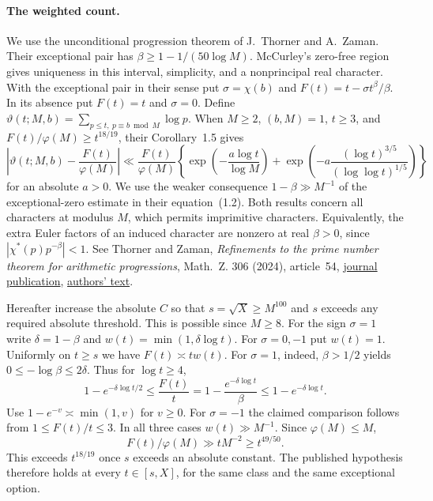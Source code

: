 \paragraph{The weighted count.}
We use the unconditional progression theorem of J.~Thorner and
A.~Zaman. Their exceptional pair has \(\beta\ge1-1/(50\log M)\).
McCurley's zero-free region gives uniqueness in this interval,
simplicity, and a nonprincipal real character. With the exceptional
pair in their sense put \(\sigma=\chi(b)\) and
\(F(t)=t-\sigma t^\beta/\beta\). In its absence put \(F(t)=t\)
and \(\sigma=0\). Define
\(\vartheta(t;M,b)=\sum_{p\le t,\ p\equiv b\bmod M}\log p\).
When \(M\ge2\), \((b,M)=1\), \(t\ge3\), and
\(F(t)/\varphi(M)\ge t^{18/19}\), their Corollary~1.5 gives
\[
 \left|\vartheta(t;M,b)-\frac{F(t)}{\varphi(M)}\right|
 \ll \frac{F(t)}{\varphi(M)}
 \left\{\exp\!\left(-\frac{a\log t}{\log M}\right)
       +\exp\!\left(-a\frac{(\log t)^{3/5}}{(\log\log t)^{1/5}}\right)
 \right\}
\]
for an absolute \(a>0\). We use the weaker consequence
\(1-\beta\gg M^{-1}\) of the exceptional-zero estimate in their
equation~(1.2). Both results concern all characters at modulus
\(M\), which permits imprimitive characters. Equivalently, the
extra Euler factors of an induced character are nonzero at real
\(\beta>0\), since \(|\chi^*(p)p^{-\beta}|<1\).
See Thorner and Zaman, \emph{Refinements to the prime number theorem
for arithmetic progressions}, Math.~Z. 306 (2024), article~54,
\href{https://doi.org/10.1007/s00209-023-03414-3}{journal publication},
\href{https://arxiv.org/abs/2108.10878}{authors' text}.

Hereafter increase the absolute \(C\) so that
\(s=\sqrt X\ge M^{100}\) and \(s\) exceeds any required absolute
threshold. This is possible since \(M\ge8\).
For the sign \(\sigma=1\) write \(\delta=1-\beta\) and
\(w(t)=\min(1,\delta\log t)\). For \(\sigma=0,-1\) put \(w(t)=1\).
Uniformly on \(t\ge s\) we have \(F(t)\asymp t w(t)\).
For \(\sigma=1\), indeed, \(\beta>1/2\) yields
\(0\le-\log\beta\le2\delta\). Thus for \(\log t\ge4\),
\[
   1-e^{-\delta\log t/2}
      \le \frac{F(t)}{t}
      =1-\frac{e^{-\delta\log t}}{\beta}
      \le 1-e^{-\delta\log t}.
\]
Use \(1-e^{-v}\asymp\min(1,v)\) for \(v\ge0\).
For \(\sigma=-1\) the claimed comparison follows from
\(1\le F(t)/t\le3\). In all three cases \(w(t)\gg M^{-1}\).
Since \(\varphi(M)\le M\),
\[
           F(t)/\varphi(M)\gg t M^{-2}\ge t^{49/50}.
\]
This exceeds \(t^{18/19}\) once \(s\) exceeds an absolute constant.
The published hypothesis therefore holds at every \(t\in[s,X]\),
for the same class and the same exceptional option.

